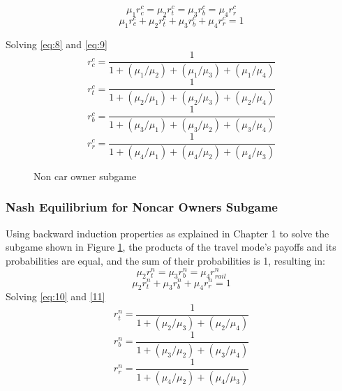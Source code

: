 \begin{equation}\label{eq:8}
\mu_1 r^c_{c} = \mu_2 r^{c}_{t} = \mu_3 r^c_{b} = \mu_4 r^c_{r}
\end{equation}
\begin{equation}\label{eq:9}
\mu_1 r^c_{c} +  \mu_2 r^{c}_{t} + \mu_3 r^c_{b} + \mu_4 r^c_{r} = 1
\end{equation}

Solving \ref{eq:8} and \ref{eq:9}
\begin{equation}\label{eq:5555}
r^c_{c} = \frac{1}{1+ (\mu_1 / \mu_2)+(\mu_1 / \mu_3)+(\mu_1 / \mu_4)}
\end{equation}
\begin{equation}
r^c_{t} = \frac{1}{1+ (\mu_2 / \mu_1)+(\mu_2 / \mu_3)+(\mu_2 / \mu_4)}
\end{equation}
\begin{equation}
r^c_{b} = \frac{1}{1+ (\mu_3 / \mu_1)+(\mu_3 / \mu_2)+(\mu_3 / \mu_4)}
\end{equation}
\begin{equation}
r^c_{r} = \frac{1}{1+ (\mu_4 / \mu_1)+(\mu_4 / \mu_2)+(\mu_4 / \mu_3)}
\end{equation}
\begin{figure}
  \centering
  \caption{Non car owner subgame\label{fig:66}}
\end{figure}
\subsubsection{Nash Equilibrium for Noncar Owners Subgame}
Using backward induction properties as explained in Chapter 1 to solve the subgame shown in Figure \ref{fig:66}, the products of the travel mode's payoffs and its probabilities are equal, and the sum of their probabilities is 1, resulting in: 
\begin{equation}\label{eq:10}
\mu_2 r^n_{t} = \mu_3 r^n_{b} = \mu_4 r^n_{rail}
\end{equation}
\begin{equation}\label{11}
\mu_2 r^n_{t} + \mu_3 r^n_{b} + \mu_4 r^n_{r} = 1
\end{equation}
Solving \ref{eq:10} and \ref{11} 
\begin{equation}
r^n_{t} = \frac{1}{1+(\mu_2 / \mu_3)+(\mu_2 / \mu_4)}
\end{equation}
\begin{equation}
r^n_{b} = \frac{1}{1+ (\mu_3 / \mu_2)+(\mu_3 / \mu_4)}
\end{equation}
\begin{equation}\label{eq:666}
r^n_{r} = \frac{1}{1+ (\mu_4 / \mu_2)+(\mu_4 / \mu_3)}
\end{equation}
